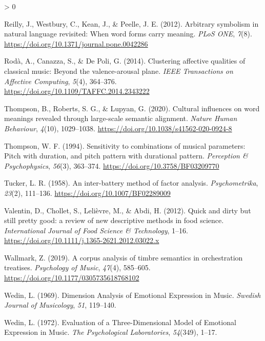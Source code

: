 \documentclass[
  english,
  man,floatsintext]{apa6}
\newlength{\cslhangindent}
\newenvironment{CSLReferences}[2] %
 {%
  \setlength{\parindent}{0pt}
  \ifodd #1 \everypar{\setlength{\hangindent}{\cslhangindent}}\ignorespaces\fi
  \ifnum #2 > 0
  \setlength{\parskip}{#2\baselineskip}
  \fi
 }%
 {}
\begin{document}
\begin{CSLReferences}{1}{0}
\leavevmode\hypertarget{ref-Reilly2012}{}%
Reilly, J., Westbury, C., Kean, J., \& Peelle, J. E. (2012). {Arbitrary symbolism in natural language revisited: When word forms carry meaning}. \emph{PLoS ONE}, \emph{7}(8). \url{https://doi.org/10.1371/journal.pone.0042286}

\leavevmode\hypertarget{ref-Roda2014}{}%
Rodà, A., Canazza, S., \& De Poli, G. (2014). {Clustering affective qualities of classical music: Beyond the valence-arousal plane}. \emph{IEEE Transactions on Affective Computing}, \emph{5}(4), 364--376. \url{https://doi.org/10.1109/TAFFC.2014.2343222}

\leavevmode\hypertarget{ref-Thompson2020}{}%
Thompson, B., Roberts, S. G., \& Lupyan, G. (2020). {Cultural influences on word meanings revealed through large-scale semantic alignment}. \emph{Nature Human Behaviour}, \emph{4}(10), 1029--1038. \url{https://doi.org/10.1038/s41562-020-0924-8}

\leavevmode\hypertarget{ref-Thompson1994}{}%
Thompson, W. F. (1994). {Sensitivity to combinations of musical parameters: Pitch with duration, and pitch pattern with durational pattern}. \emph{Perception {\&} Psychophysics}, \emph{56}(3), 363--374. \url{https://doi.org/10.3758/BF03209770}

\leavevmode\hypertarget{ref-Tucker1958}{}%
Tucker, L. R. (1958). {An inter-battery method of factor analysis}. \emph{Psychometrika}, \emph{23}(2), 111--136. \url{https://doi.org/10.1007/BF02289009}

\leavevmode\hypertarget{ref-Valentin2012}{}%
Valentin, D., Chollet, S., Lelièvre, M., \& Abdi, H. (2012). {Quick and dirty but still pretty good: a review of new descriptive methods in food science}. \emph{International Journal of Food Science {\&} Technology}, 1--16. \url{https://doi.org/10.1111/j.1365-2621.2012.03022.x}

\leavevmode\hypertarget{ref-Wallmark2019}{}%
Wallmark, Z. (2019). {A corpus analysis of timbre semantics in orchestration treatises}. \emph{Psychology of Music}, \emph{47}(4), 585--605. \url{https://doi.org/10.1177/0305735618768102}

\leavevmode\hypertarget{ref-Wedin1969}{}%
Wedin, L. (1969). {Dimension Analysis of Emotional Expression in Music}. \emph{Swedish Journal of Musicology}, \emph{51}, 119--140.

\leavevmode\hypertarget{ref-Wedin1972}{}%
Wedin, L. (1972). {Evaluation of a Three-Dimensional Model of Emotional Expression in Music}. \emph{The Psychological Laboratories}, \emph{54}(349), 1--17.


\end{CSLReferences}
\end{document}
